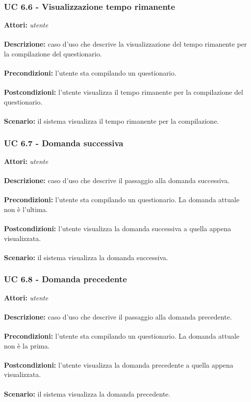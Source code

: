 \documentclass[a4paper,11pt]{article}
\begin{document}
\subsubsection{UC 6.6 - Visualizzazione tempo rimanente}

\textbf{Attori:} \textit{utente}
\\ \\
\textbf{Descrizione:} caso d'uso che descrive la visualizzazione del tempo rimanente per la compilazione del questionario.\\
\\
\textbf{Precondizioni:} l'utente sta compilando un questionario.\\
\\
\textbf{Postcondizioni:} l'utente visualizza il tempo rimanente per la compilazione del questionario.\\
\\
\textbf{Scenario:} il sistema visualizza il tempo rimanente per la compilazione.\\


\subsubsection{UC 6.7 - Domanda successiva}

\textbf{Attori:} \textit{utente}
\\ \\
\textbf{Descrizione:} caso d'uso che descrive il passaggio alla domanda successiva.\\
\\
\textbf{Precondizioni:} l'utente sta compilando un questionario. La domanda attuale non è l'ultima.\\
\\
\textbf{Postcondizioni:} l'utente visualizza la domanda successiva a quella appena visualizzata.\\
\\
\textbf{Scenario:} il sistema visualizza la domanda successiva.\\


\subsubsection{UC 6.8 - Domanda precedente}

\textbf{Attori:} \textit{utente}
\\ \\
\textbf{Descrizione:} caso d'uso che descrive il passaggio alla domanda precedente.\\
\\
\textbf{Precondizioni:} l'utente sta compilando un questionario. La domanda attuale non è la prima.\\
\\
\textbf{Postcondizioni:} l'utente visualizza la domanda precedente a quella appena visualizzata.\\
\\
\textbf{Scenario:} il sistema visualizza la domanda precedente.\\
\end{document}
